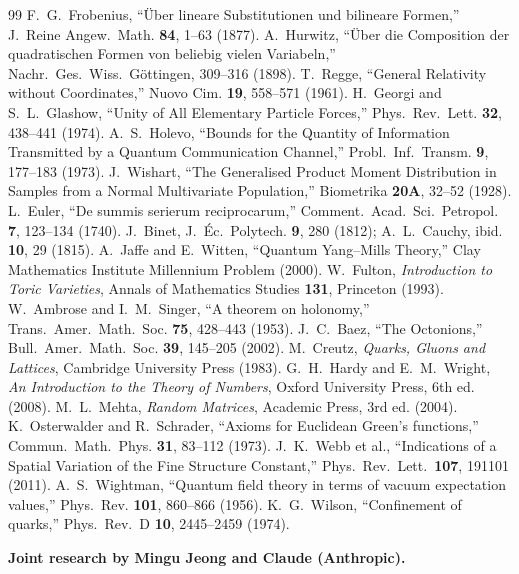\documentclass[12pt]{article}
\theoremstyle{remark}
\theoremstyle{definition}
\begin{document}
\begin{thebibliography}{99}
 F.~G.~Frobenius, ``\"Uber lineare Substitutionen und bilineare Formen,'' J.~Reine Angew.~Math. \textbf{84}, 1--63 (1877).
 A.~Hurwitz, ``\"Uber die Composition der quadratischen Formen von beliebig vielen Variabeln,'' Nachr.~Ges.~Wiss.~G\"ottingen, 309--316 (1898).
 T.~Regge, ``General Relativity without Coordinates,'' Nuovo Cim. \textbf{19}, 558--571 (1961).
 H.~Georgi and S.~L.~Glashow, ``Unity of All Elementary Particle Forces,'' Phys.~Rev.~Lett. \textbf{32}, 438--441 (1974).
 A.~S.~Holevo, ``Bounds for the Quantity of Information Transmitted by a Quantum Communication Channel,'' Probl.~Inf.~Transm. \textbf{9}, 177--183 (1973).
 J.~Wishart, ``The Generalised Product Moment Distribution in Samples from a Normal Multivariate Population,'' Biometrika \textbf{20A}, 32--52 (1928).
 L.~Euler, ``De summis serierum reciprocarum,'' Comment.~Acad.~Sci.~Petropol. \textbf{7}, 123--134 (1740).
 J.~Binet, J.~\'Ec.~Polytech. \textbf{9}, 280 (1812); A.~L.~Cauchy, ibid. \textbf{10}, 29 (1815).
 A.~Jaffe and E.~Witten, ``Quantum Yang--Mills Theory,'' Clay Mathematics Institute Millennium Problem (2000).
 W.~Fulton, \textit{Introduction to Toric Varieties}, Annals of Mathematics Studies \textbf{131}, Princeton (1993).
 W.~Ambrose and I.~M.~Singer, ``A theorem on holonomy,'' Trans.~Amer.~Math.~Soc. \textbf{75}, 428--443 (1953).
 J.~C.~Baez, ``The Octonions,'' Bull.~Amer.~Math.~Soc. \textbf{39}, 145--205 (2002).
 M.~Creutz, \textit{Quarks, Gluons and Lattices}, Cambridge University Press (1983).
 G.~H.~Hardy and E.~M.~Wright, \textit{An Introduction to the Theory of Numbers}, Oxford University Press, 6th ed. (2008).
 M.~L.~Mehta, \textit{Random Matrices}, Academic Press, 3rd ed. (2004).
 K.~Osterwalder and R.~Schrader, ``Axioms for Euclidean Green's functions,'' Commun.~Math.~Phys. \textbf{31}, 83--112 (1973).
 J.~K.~Webb et al., ``Indications of a Spatial Variation of the Fine Structure Constant,'' Phys.~Rev.~Lett.\ \textbf{107}, 191101 (2011).
 A.~S.~Wightman, ``Quantum field theory in terms of vacuum expectation values,'' Phys.~Rev. \textbf{101}, 860--866 (1956).
 K.~G.~Wilson, ``Confinement of quarks,'' Phys.~Rev.~D \textbf{10}, 2445--2459 (1974).
\end{thebibliography}

\bigskip
\noindent\textbf{Joint research by Mingu Jeong and Claude (Anthropic).}
\end{document}
